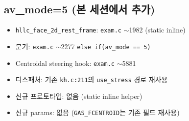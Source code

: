 \documentclass[11pt]{article}
\begin{document}
\subsection*{av\_mode=5 (본 세션에서 추가)}
\begin{itemize}
  \item \texttt{hllc\_face\_2d\_rest\_frame}: \texttt{exam.c} $\sim$1982 (static inline)
  \item 분기: \texttt{exam.c} $\sim$2277 \texttt{else if(av\_mode == 5)}
  \item Centroidal steering hook: \texttt{exam.c} $\sim$5881
  \item 디스패처: 기존 \texttt{kh.c:211}의 \texttt{use\_stress} 경로 재사용
  \item 신규 프로토타입: 없음 (static inline helper)
  \item 신규 params: 없음 (\texttt{GAS\_FCENTROID}는 기존 필드 재사용)
\end{itemize}
\end{document}
